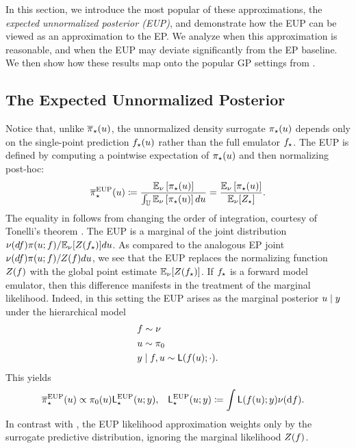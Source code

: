 \documentclass[12pt]{article}
\begin{document}
In this section, we introduce the most popular of these approximations, the 
\textit{expected unnormalized posterior (EUP)}, and demonstrate 
how the EUP can be viewed as an approximation to the EP.
We analyze when this approximation is reasonable, and when the EUP may 
deviate significantly from the EP baseline. We then show how these results map 
onto the popular GP settings from .

\subsection{The Expected Unnormalized Posterior} \label{sec:eup}
Notice that, unlike ${\overline{\pi}}_{\star}(u)$, the unnormalized density surrogate
${\pi}_{\star}(u)$ depends only on the single-point prediction ${f}_{\star}(u)$
rather than the full emulator ${f}_{\star}$. The EUP is defined by computing
a pointwise expectation of ${\pi}_{\star}(u)$ and then normalizing post-hoc:
\begin{equation}
{\overline{\pi}}_{\star}^{\mathrm{EUP}}(u) \coloneqq 
\frac{\mathbb{E}_{\nu} \left[{\pi}_{\star}(u) \right]}{\int_{\mathbb{U}} \mathbb{E}_{\nu}\left[{\pi}_{\star}(u) \right] du}
= \frac{\mathbb{E}_{\nu}\left[{\pi}_{\star}(u) \right]}{\mathbb{E}_{\nu}[{Z}_{\star}]}. \label{eq:post-approx-EUP} 
\end{equation}
The equality in  follows from
changing the order of integration, courtesy of Tonelli's theorem \citep{StuartTeck1}. The EUP
is a marginal of the joint distribution 
$\nu(df) \pi(u; f) / \mathbb{E}_{\nu}[Z({f}_{\star})] du$. 
As compared to the analogous EP joint
$\nu(df) \pi(u; f) / Z(f) du$,
we see that the EUP replaces the normalizing function $Z(f)$ with
the global point estimate $\mathbb{E}_{\nu}[Z({f}_{\star})]$. If ${f}_{\star}$ is a forward 
model emulator, then this difference manifests in the treatment of the marginal likelihood.
Indeed, in this setting the EUP arises as the marginal posterior 
$u \mid y$ under the hierarchical model
\begin{align*}
&f  \sim \nu \\
&u \sim \pi_0 \\
&y \mid f, u \sim \mathsf{L}(f(u); \cdot).
\label{eq:eup-prob-model}
\end{align*}
This yields 
\begin{align*}
&\postApproxEUPNorm(\Par) \propto \priorDens(\Par) \likApproxEUP(\Par; \obs),
&&\likApproxEUP(\Par; \obs) \Def \int \lik(\targetTraj(\Par); \obs) \emDist(\d\targetTraj). 
\end{align*}
In contrast with , the EUP likelihood approximation 
weights only by the surrogate predictive distribution, ignoring the marginal 
likelihood $Z(f)$.
\end{document}
